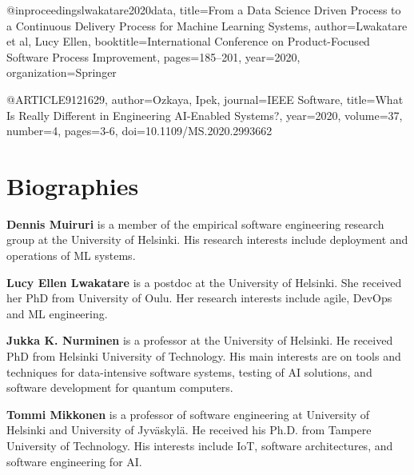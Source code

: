 \documentclass{IEEEcsmag}
\begin{document}
@inproceedings{lwakatare2020data,
  title={From a Data Science Driven Process to a Continuous Delivery Process for Machine Learning Systems},
  author={Lwakatare et al, Lucy Ellen},
  booktitle={International Conference on Product-Focused Software Process Improvement},
  pages={185--201},
  year={2020},
  organization={Springer}
}

@ARTICLE{9121629,  
author={Ozkaya, Ipek},
journal={IEEE Software},
title={What Is Really Different in Engineering {AI}-Enabled Systems?},
year={2020},  volume={37},  number={4},  pages={3-6},  doi={10.1109/MS.2020.2993662}
}





 

\section*{\textbf{Biographies}}
\label{sec:biographies}
\textbf{Dennis Muiruri} is a member of the empirical software engineering research group at the University of Helsinki. His research interests include deployment and operations of ML systems.

\textbf{Lucy Ellen Lwakatare} is a postdoc at the University of Helsinki. She received her PhD from University of Oulu.
Her research interests include agile, DevOps and ML engineering.

\textbf{Jukka K. Nurminen} is a professor at the University of Helsinki. 
He received PhD from Helsinki University of Technology. His main interests are on tools and techniques for data-intensive software systems, testing of AI solutions, and software development for quantum computers.

\textbf{Tommi Mikkonen} is a professor of software engineering at University of Helsinki and University of Jyv\"{a}skyl\"{a}. He received his Ph.D. from Tampere University of Technology. His interests include IoT, software architectures, and software engineering for AI.
 
\end{document}
